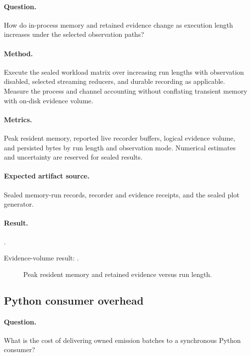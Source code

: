\paragraph{Question.} How do in-process memory and retained evidence change
as execution length increases under the selected observation paths?

\paragraph{Method.} Execute the sealed workload matrix over increasing run
lengths with observation disabled, selected streaming reducers, and durable
recording as applicable. Measure the process and channel accounting without
conflating transient memory with on-disk evidence volume.

\paragraph{Metrics.} Peak resident memory, reported live recorder buffers,
logical evidence volume, and persisted bytes by run length and observation
mode. Numerical estimates and uncertainty are reserved for sealed results.

\paragraph{Expected artifact source.} Sealed memory-run records, recorder and
evidence receipts, and the sealed plot generator.

\paragraph{Result.} \TBAMemoryResult.\par
\noindent Evidence-volume result: \TBAStorageResult.

\begin{figure}[t]
  \centering
  \PaperPlaceholderFigure{2.6cm}{\TBAMemoryFigure}
  \caption{Peak resident memory and retained evidence versus run length.
  \TBAMemoryCaption}
  \label{fig:memory-scaling}
\end{figure}

\subsection{Python consumer overhead}
\label{sec:python-sink}

\paragraph{Question.} What is the cost of delivering owned emission batches
to a synchronous Python consumer?


